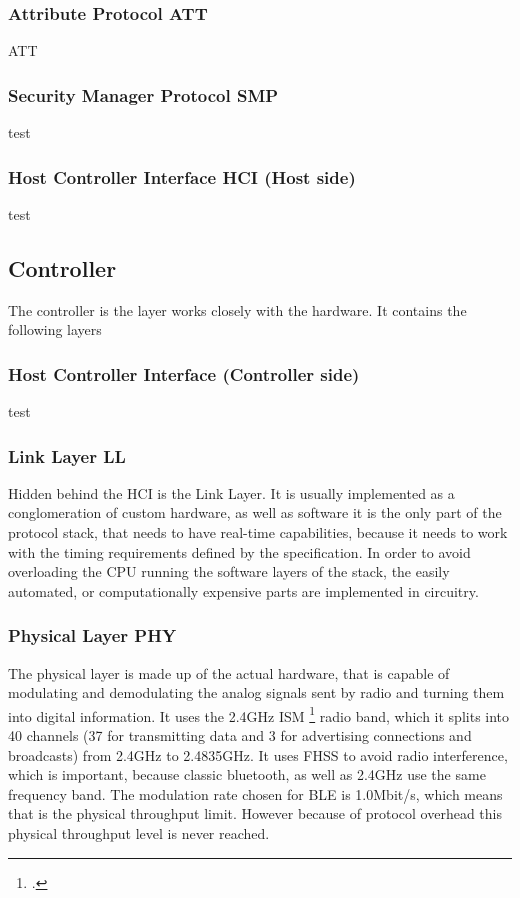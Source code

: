 \subsubsection{Attribute Protocol ATT}
ATT

\subsubsection{Security Manager Protocol SMP}
test

\subsubsection{Host Controller Interface HCI (Host side)}
test

\subsection{Controller}
The controller is the layer works closely with the hardware. It contains the following layers

\subsubsection{Host Controller Interface (Controller side)}
test

\subsubsection{Link Layer LL}
Hidden behind the HCI is the Link Layer. It is usually implemented as a conglomeration of custom hardware, as well as software it is the only part
of the protocol stack, that needs to have real-time capabilities, because it needs to work with the timing requirements defined by the specification.
In order to avoid overloading the CPU running the software layers of the stack, the easily automated, or computationally expensive parts are implemented in circuitry.


\subsubsection{Physical Layer PHY}
The physical layer is made up of the actual hardware, that is capable of modulating and demodulating the analog signals sent by radio and turning them into digital information. It uses the 2.4GHz ISM \footcite{ism} radio band, which it splits into 40 channels (37 for transmitting data and 3 for advertising connections and broadcasts) from 2.4GHz to 2.4835GHz. It uses FHSS to avoid radio interference, which is important, because classic bluetooth, as well as 2.4GHz use the same frequency band. The modulation rate chosen for BLE is 1.0Mbit/s, which means that is the physical throughput limit. However because of protocol overhead this physical throughput level is never reached.

